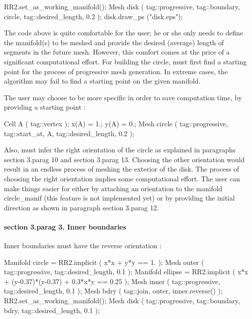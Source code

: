    RR2.set_as_working_manifold();
   Mesh disk ( tag::progressive, tag::boundary, circle, tag::desired_length, 0.2 );
   disk.draw_ps ("disk.eps");
\endverbatim

The code above is quite comfortable for the user; he or she only needs to define
the manifold(s) to be meshed and provide the desired (average) length of segments
in the future mesh.
However, this comfort comes at the price of a significant computational effort.
For building the {\codett circle}, {\ManiFEM} must first find a starting point for the process
of progressive mesh generation.
In extreme cases, the algorithm may fail to find a starting point on the given manifold.

The user may choose to be more specific in order to save computation time,
by providing a starting point :

\verbatim
   Cell A ( tag::vertex );  x(A) = 1.;  y(A) = 0.;
   Mesh circle ( tag::progressive, tag::start_at, A, tag::desired_length, 0.2 );
\endverbatim

Also, {\maniFEM} must infer the right orientation of the {\codett circle}
as explained in paragraphs \numb section 3.\numb parag 10 and \numb section 3.\numb parag 13.
Choosing the other orientation would result in an endless process of meshing the exterior of
the disk.
The process of choosing the right orientation implies some computational effort.
The user can make things easier for {\maniFEM} either by attaching an orientation
to the manifold {\codett circle\_manif} (this feature is not implemented yet)
or by providing the initial direction as shown in paragraph \numb section 3.\numb parag 12.


\paragraph{\numb section 3.\numb parag 3. Inner boundaries}

Inner boundaries must have the reverse orientation :

\verbatim
   Manifold circle = RR2.implicit ( x*x + y*y == 1. );
   Mesh outer ( tag::progressive, tag::desired_length, 0.1 );
   Manifold ellipse = RR2.implicit ( x*x + (y-0.37)*(y-0.37) + 0.3*x*y == 0.25 );
   Mesh inner ( tag::progressive, tag::desired_length, 0.1 );
   Mesh bdry ( tag::join, outer, inner.reverse() );
   RR2.set_as_working_manifold();
   Mesh disk ( tag::progressive, tag::boundary, bdry, tag::desired_length, 0.1 );
   \endverbatim

